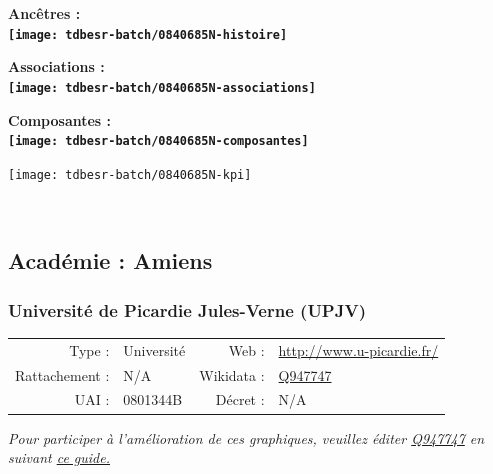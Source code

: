 \documentclass[12pt,french,]{article}
\begin{document}
\vspace{1cm}  
\begin{minipage}[b]{0.50\textwidth}\begin{center} \bf Ancêtres : \\  
\texttt{[image: tdbesr-batch/0840685N-histoire]} \end{center}\end{minipage}\begin{minipage}[b]{0.50\textwidth}\begin{center} \bf Associations : \\  
\texttt{[image: tdbesr-batch/0840685N-associations]} \end{center}\end{minipage}

\hrulefill

\begin{center} \bf Composantes : \\  
\texttt{[image: tdbesr-batch/0840685N-composantes]} \end{center}

\begin{center}\texttt{[image: tdbesr-batch/0840685N-kpi]} \end{center}\checkoddpage

\ifoddpage \fi ~\newpage  

\hypertarget{acaduxe9mie-amiens}{%
\subsection{Académie : Amiens}\label{acaduxe9mie-amiens}}

\hypertarget{universituxe9-de-picardie-jules-verne-upjv}{%
\subsubsection{Université de Picardie Jules-Verne
(UPJV)}\label{universituxe9-de-picardie-jules-verne-upjv}}

\begin{tabular*}{\textwidth}{rp{5cm}rl}  
\hline  
Type : & Université & Web : &\href{http://www.u-picardie.fr/}{http://www.u-picardie.fr/} \\  
Rattachement : & N/A & Wikidata : & \href{https://www.wikidata.org/entity/Q947747}{Q947747} \\  
UAI : & 0801344B & Décret : & N/A \\  
\hline  
\end{tabular*}

\textit{\scriptsize Pour participer à l'amélioration de ces graphiques, veuillez éditer  \href{https://www.wikidata.org/entity/Q947747}{Q947747}  en suivant \href{https://github.com/cpesr/wikidataESR/blob/master/Rmd/wikidataESR.md}{ce guide.}}
\end{document}
